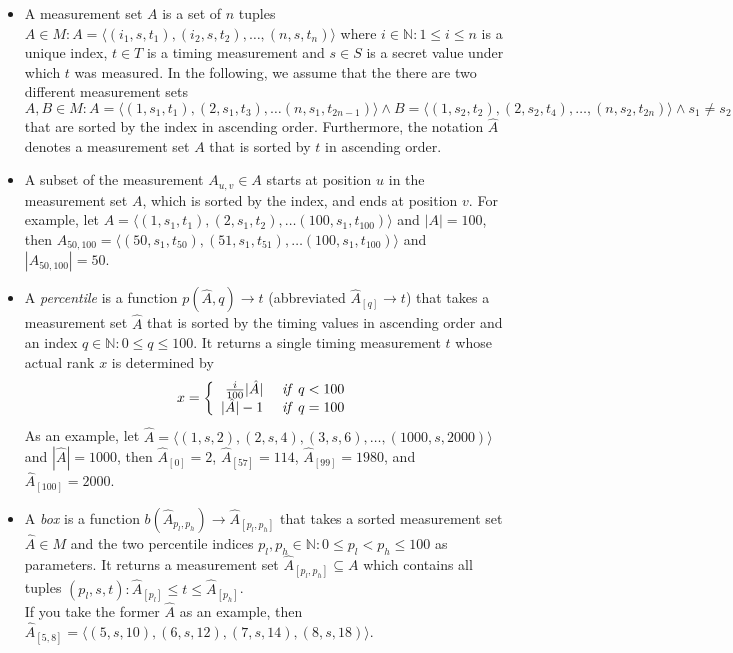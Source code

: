 \documentclass[12pt]{article}
\newcommand{\id}[1]{\mbox{\textit{#1}}}
\begin{document}
\begin{itemize}
  \item A measurement set $A$ is a set of $n$ tuples $A\in M: A=\langle(i_1,s,t_1), (i_2,s,t_2), \ldots, (n,s,t_n)\rangle$ where
    $i\in \mathbb{N}: 1 \leq i \leq n$ is a unique index, $t\in T$ is a timing measurement and $s\in S$ is a secret value
    under which $t$ was measured. In the following, we assume that the there are two different 
    measurement sets
    $A,B\in M: A=\langle (1,s_1,t_1), (2,s_1,t_3), \ldots (n,s_1,t_{2n-1})\rangle \land B=\langle(1,s_2,t_2), (2,s_2,t_4), \ldots, (n,s_2,t_{2n})\rangle
    \land s_1\neq s_2$ that are sorted by the index in ascending order. Furthermore, the notation $\hat{A}$ denotes a measurement set
    $A$ that is sorted by $t$ in ascending order.

  \item A subset of the measurement $A_{u,v}\in A$ starts at position $u$ in the measurement set $A$, which
  is sorted by the index, and ends at position $v$. For example, let 
  $A=\langle (1,s_1,t_1), (2,s_1,t_2), \ldots (100,s_1,t_{100})\rangle$ and $|A|=100$, then 
  $A_{50,100}=\langle (50,s_1,t_{50}), (51,s_1,t_{51}), \ldots (100,s_1,t_{100})\rangle$ and $|A_{50,100}|=50$.

  \item A \emph{percentile} is a function $p(\hat{A}, q)\to t$ (abbreviated $\hat{A}_{[q]} \to t$) that takes a measurement
    set $\hat{A}$ that is sorted by the timing values in ascending order and an index
    $q\in \mathbb{N}: 0 \leq q \leq 100$. It returns a single timing measurement $t$ whose
    actual rank $x$ is determined by
    \begin{equation}
    x=\left\{
      \begin{array}{rl} 
        \frac{i}{100}|\hat{A}| & \id{ if } q < 100\\
             |\hat{A}| -1      & \id{ if } q = 100\\
      \end{array} \right.
    \end{equation}
    As an example, let
    $\hat{A}=\langle (1,s,2), (2,s,4), (3,s,6), \ldots, (1000,s,2000)\rangle $ and $|\hat{A}|=1000$, then $\hat{A}_{[0]}=2$, $\hat{A}_{[57]}=114$, $\hat{A}_{[99]}=1980$, and $\hat{A}_{[100]}=2000$.

  \item A \emph{box} is a function $b(\hat{A}_{p_l,p_h}) \to \hat{A}_{[p_l,p_h]}$ that takes a sorted measurement set $\hat{A}\in M$ and the
    two percentile indices
    $p_l,p_h\in \mathbb{N}: 0 \leq p_l < p_h \leq 100$ as parameters. It returns a measurement set $\hat{A}_{[p_l,p_h]}\subseteq A$
    which contains all tuples $(p_l,s,t): \hat{A}_{[p_l]}\leq t \leq \hat{A}_{[p_h]}$.\\
    If you take the former $\hat{A}$ as an example,
    then $\hat{A}_{[5,8]}=\langle (5,s,10),(6,s,12),(7,s,14),(8,s,18) \rangle$.


\end{itemize}
\end{document}

